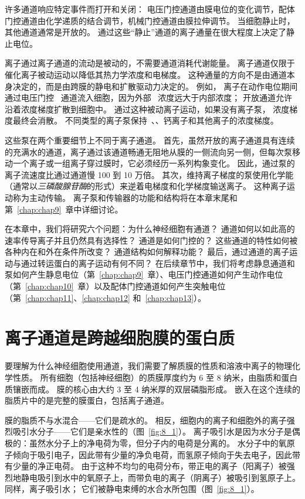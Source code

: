 许多通道响应特定事件而打开和关闭：
电压门控通道由膜电位的变化调节，配体门控通道由化学递质的结合调节，机械门控通道由膜拉伸调节。
当细胞静止时，其他通道通常是开放的。
通过这些“静止”通道的离子通量在很大程度上决定了静止电位。


离子通过离子通道的流动是被动的，不需要通道消耗代谢能量。
离子通道仅限于催化离子被动运动以降低其热力学浓度和电梯度。
这种通量的方向不是由通道本身决定的，而是由跨膜的静电和扩散驱动力决定的。
例如， 离子在动作电位期间通过电压门控~ 通道流入细胞，因为外部~ 浓度远大于内部浓度；
开放通道允许~ 沿着浓度梯度扩散到细胞中。
通过这种被动离子运动，如果没有离子泵， 浓度梯度最终会消散。
不同类型的离子泵保持~、、钙离子和其他离子的浓度梯度。


这些泵在两个重要细节上不同于离子通道。
首先，虽然开放的离子通道具有连续的充满水的通道，离子通过该通道畅通无阻地从膜的一侧流向另一侧，但每次泵移动一个离子或一组离子穿过膜时，它必须经历一系列构象变化。
因此，通过泵的离子流速度比通过通道慢 100 到 10 万倍。
其次，维持离子梯度的泵使用化学能（通常以\textit{三磷酸腺苷酶}的形式）来逆着电梯度和化学梯度输送离子。
这种离子运动称为主动传输。
离子泵和传输器的功能和结构将在本章末尾和第~\ref{chap:chap9}~章中详细讨论。


在本章中，我们将研究六个问题：为什么神经细胞有通道？
通道如何以如此高的速率传导离子并且仍然具有选择性？ 
通道是如何门控的？
这些通道的特性如何被各种内在和外在条件所改变？
通道结构如何解释功能？
最后，通过通道的离子运动与通过转运蛋白的离子运动有何不同？
在后续章节中，我们将考虑静息通道和泵如何产生静息电位（第~\ref{chap:chap9}~章）、电压门控通道如何产生动作电位（第~\ref{chap:chap10}~章）以及配体门控通道如何产生突触电位（第~\ref{chap:chap11}、\ref{chap:chap12} 和~\ref{chap:chap13}）。



\section{离子通道是跨越细胞膜的蛋白质}

要理解为什么神经细胞使用通道，我们需要了解质膜的性质和溶液中离子的物理化学性质。
所有细胞（包括神经细胞）的质膜厚度约为 6 至 8 纳米，由脂质和蛋白质镶嵌而成。
膜的核心由大约 3 至 4 纳米厚的双层磷脂形成。
嵌入在这个连续的脂质片中的是完整的膜蛋白，包括离子通道。


膜的脂质不与水混合——它们是疏水的。
相反，细胞内的离子和细胞外的离子强烈吸引水分子——它们是亲水性的（图~\ref{fig:8_1}）。
离子吸引水是因为水分子是偶极的：虽然水分子上的净电荷为零，但分子内的电荷是分离的。
水分子中的氧原子倾向于吸引电子，因此带有少量的净负电荷，而氢原子倾向于失去电子，因此带有少量的净正电荷。
由于这种不均匀的电荷分布，带正电的离子（阳离子）被强烈地静电吸引到水中的氧原子上，而带负电的离子（阴离子）被吸引到氢原子上。
同样，离子吸引水；
它们被静电束缚的水合水所包围（图~\ref{fig:8_1}）。


